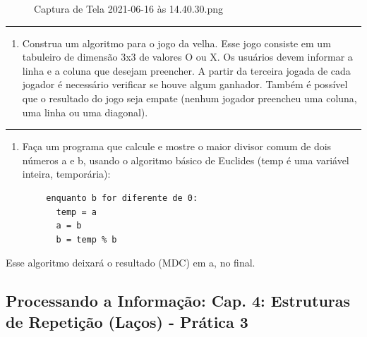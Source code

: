 \documentclass[12pt,a4paper]{article}
\providecommand{\tightlist}{%
      \setlength{\itemsep}{0pt}\setlength{\parskip}{0pt}}
\begin{document}
    \begin{figure}
\centering
\caption{Captura de Tela 2021-06-16 às 14.40.30.png}
\end{figure}

    \begin{center}\rule{0.5\linewidth}{0.5pt}\end{center}

\begin{enumerate}
\def\labelenumi{\arabic{enumi}.}
\setcounter{enumi}{11}
\tightlist
\item
  Construa um algoritmo para o jogo da velha. Esse jogo consiste em um
  tabuleiro de dimensão 3x3 de valores O ou X. Os usuários devem
  informar a linha e a coluna que desejam preencher. A partir da
  terceira jogada de cada jogador é necessário verificar se houve algum
  ganhador. Também é possível que o resultado do jogo seja empate
  (nenhum jogador preencheu uma coluna, uma linha ou uma diagonal).
\end{enumerate}

    \begin{center}\rule{0.5\linewidth}{0.5pt}\end{center}

\begin{enumerate}
\def\labelenumi{\arabic{enumi}.}
\setcounter{enumi}{12}
\tightlist
\item
  Faça um programa que calcule e mostre o maior divisor comum de dois
  números a e b, usando o algoritmo básico de Euclides (temp é uma
  variável inteira, temporária):
\end{enumerate}

\begin{verbatim}
        enquanto b for diferente de 0:
          temp = a
          a = b
          b = temp % b
\end{verbatim}

Esse algoritmo deixará o resultado (MDC) em a, no final.

    \hypertarget{processando-a-informauxe7uxe3o-cap.-4-estruturas-de-repetiuxe7uxe3o-lauxe7os---pruxe1tica-3}{%
\subsection{Processando a Informação: Cap. 4: Estruturas de Repetição
(Laços) - Prática
3}\label{processando-a-informauxe7uxe3o-cap.-4-estruturas-de-repetiuxe7uxe3o-lauxe7os---pruxe1tica-3}}
\end{document}
